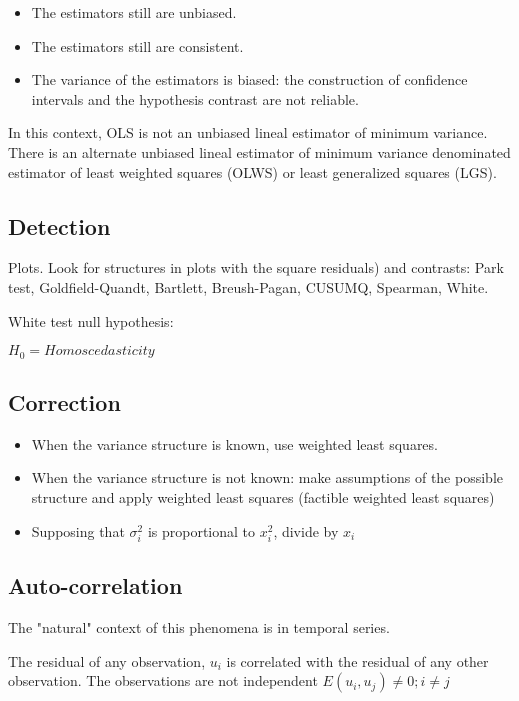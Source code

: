 \documentclass[10pt,landscape]{article}
\begin{document}
\begin{multicols}{3}
\begin{itemize}[leftmargin=*]
\item The estimators still are unbiased.
\item The estimators still are consistent.
\item The variance of the estimators is biased: the construction of confidence intervals and the hypothesis contrast are not reliable.
\end{itemize}

In this context, OLS is not an unbiased lineal estimator of minimum variance. There is an alternate unbiased lineal estimator of minimum variance denominated estimator of least weighted squares (OLWS) or least generalized squares (LGS).

\subsection*{Detection}

Plots. Look for structures in plots with the square residuals) and contrasts: Park test, Goldfield-Quandt, Bartlett, Breush-Pagan, CUSUMQ, Spearman, White.

White test null hypothesis:

$H_0 = Homoscedasticity$

\subsection*{Correction}

\begin{itemize}[leftmargin=*]
	\item When the variance structure is known, use weighted least squares.
	\item When the variance structure is not known: make assumptions of the possible structure and apply weighted least squares (factible weighted least squares)
	\item Supposing that $\sigma_i^2$ is proportional to $x_i^2$, divide by $x_i$
\end{itemize}

\subsection*{Auto-correlation}

The "natural" context of this phenomena is in temporal series.

The residual of any observation, $u_i$ is correlated with the residual of any other observation. The observations are not independent $E(u_i,u_j) \neq 0; i \neq j$



\end{multicols}
\end{document}
